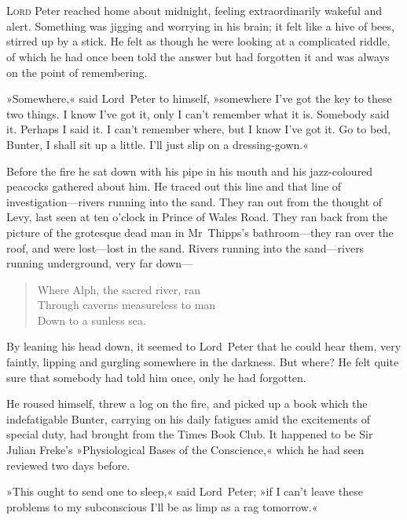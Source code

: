 \chapter[Chapter \thechapter]{}
\lettrine[lines=4]{L}{ord} Peter reached home about midnight, feeling extraordinarily wakeful and alert. Something was jigging and worrying in his brain; it felt like a hive of bees, stirred up by a stick. He felt as though he were looking at a complicated riddle, of which he had once been told the answer but had forgotten it and was always on the point of remembering.

»Somewhere,« said Lord~Peter to himself, »somewhere I've got the key to these two things. I know I've got it, only I can't remember what it is. Somebody said it. Perhaps I said it. I can't remember where, but I know I've got it. Go to bed, Bunter, I shall sit up a little. I'll just slip on a dressing-gown.«

Before the fire he sat down with his pipe in his mouth and his jazz-coloured peacocks gathered about him. He traced out this line and that line of investigation—rivers running into the sand. They ran out from the thought of Levy, last seen at ten o'clock in Prince of Wales Road. They ran back from the picture of the grotesque dead man in Mr~Thipps's bathroom—they ran over the roof, and were lost—lost in the sand. Rivers running into the sand—rivers running underground, very far down—

\begin{verse}
Where Alph, the sacred river, ran\\
Through caverns measureless to man\\
Down to a sunless sea.\\
\end{verse}


By leaning his head down, it seemed to Lord~Peter that he could hear them, very faintly, lipping and gurgling somewhere in the darkness. But where? He felt quite sure that somebody had told him once, only he had forgotten.

He roused himself, threw a log on the fire, and picked up a book which the indefatigable Bunter, carrying on his daily fatigues amid the excitements of special duty, had brought from the Times Book Club. It happened to be Sir Julian Freke's »Physiological Bases of the Conscience,« which he had seen reviewed two days before.

»This ought to send one to sleep,« said Lord~Peter; »if I can't leave these problems to my subconscious I'll be as limp as a rag tomorrow.«

